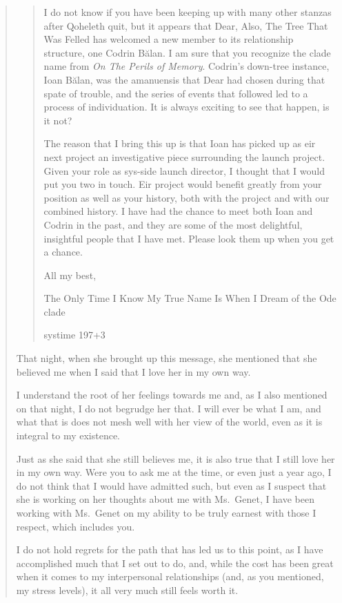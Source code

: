 \begin{quote}
\begin{quote}
I do not know if you have been keeping up with many other stanzas after Qoheleth quit, but it appears that Dear, Also, The Tree That Was Felled has welcomed a new member to its relationship structure, one Codrin Bălan. I am sure that you recognize the clade name from \emph{On The Perils of Memory}. Codrin's down-tree instance, Ioan Bălan, was the amanuensis that Dear had chosen during that spate of trouble, and the series of events that followed led to a process of individuation. It is always exciting to see that happen, is it not?

The reason that I bring this up is that Ioan has picked up as eir next project an investigative piece surrounding the launch project. Given your role as sys-side launch director, I thought that I would put you two in touch. Eir project would benefit greatly from your position as well as your history, both with the project and with our combined history. I have had the chance to meet both Ioan and Codrin in the past, and they are some of the most delightful, insightful people that I have met. Please look them up when you get a chance.

All my best,

The Only Time I Know My True Name Is When I Dream of the Ode clade

systime 197+3
\end{quote}

That night, when she brought up this message, she mentioned that she believed me when I said that I love her in my own way.

I understand the root of her feelings towards me and, as I also mentioned on that night, I do not begrudge her that. I will ever be what I am, and what that is does not mesh well with her view of the world, even as it is integral to my existence.

Just as she said that she still believes me, it is also true that I still love her in my own way. Were you to ask me at the time, or even just a year ago, I do not think that I would have admitted such, but even as I suspect that she is working on her thoughts about me with Ms.~Genet, I have been working with Ms.~Genet on my ability to be truly earnest with those I respect, which includes you.

I do not hold regrets for the path that has led us to this point, as I have accomplished much that I set out to do, and, while the cost has been great when it comes to my interpersonal relationships (and, as you mentioned, my stress levels), it all very much still feels worth it.


\end{quote}

